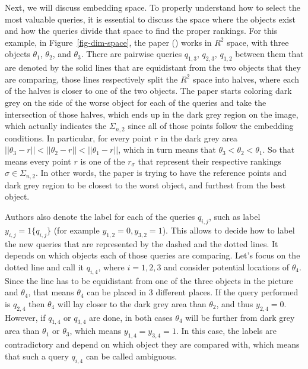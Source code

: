 \documentclass[
  letterpaper,
  numbers=noenddot,
  DIV=11,
  oneside]{scrreprt}
\theoremstyle{remark}
\begin{document}
Next, we will discuss embedding space. To properly understand how to
select the most valuable queries, it is essential to discuss the space
where the objects exist and how the queries divide that space to find
the proper rankings. For this example, in Figure~\ref{fig-dim-space},
the paper () works in \(R^2\)
space, with three objects \(\theta_1\), \(\theta_2\), and \(\theta_3\).
There are pairwise queries \(q_{1,3}\), \(q_{2,3}\), \(q_{1,2}\) between
them that are denoted by the solid lines that are equidistant from the
two objects that they are comparing, those lines respectively split the
\(R^2\) space into halves, where each of the halves is closer to one of
the two objects. The paper starts coloring dark grey on the side of the
worse object for each of the queries and take the intersection of those
halves, which ends up in the dark grey region on the image, which
actually indicates the \(\Sigma_{n,2}\) since all of those points follow
the embedding conditions. In particular, for every point \(r\) in the
dark grey area
\(||\theta_3 - r|| < ||\theta_2 - r|| < ||\theta_1 -  r||\), which in
turn means that \(\theta_3 < \theta_2 < \theta_1\). So that means every
point \(r\) is one of the \(r_\sigma\) that represent their respective
rankings \(\sigma \in \Sigma_{n,2}\). In other words, the paper is
trying to have the reference points and dark grey region to be closest
to the worst object, and furthest from the best object.

Authors also denote the label for each of the queries \(q_{i,j}\), such
as label \(y_{i,j} = 1\{q_{i,j}\}\) (for example
\(y_{1,2} = 0, y_{3,2} = 1\)). This allows to decide how to label the
new queries that are represented by the dashed and the dotted lines. It
depends on which objects each of those queries are comparing. Let's
focus on the dotted line and call it \(q_{i,4}\), where \(i={1,2,3}\)
and consider potential locations of \(\theta_4\). Since the line has to
be equidistant from one of the three objects in the picture and
\(\theta_4\), that means \(\theta_4\) can be placed in 3 different
places. If the query performed is \(q_{2,4}\) then \(\theta_4\) will lay
closer to the dark grey area than \(\theta_2\), and thus
\(y_{2,4} = 0\). However, if \(q_{1,4}\) or \(q_{3,4}\) are done, in
both cases \(\theta_4\) will be further from dark grey area than
\(\theta_1\) or \(\theta_3\), which means \(y_{1,4} = y_{3,4} = 1\). In
this case, the labels are contradictory and depend on which object they
are compared with, which means that such a query \(q_{i,4}\) can be
called ambiguous.
\end{document}
